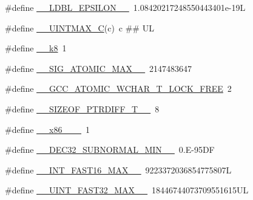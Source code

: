\begin{DoxyCompactItemize}
\item 
\#define \hyperlink{build-analizer__host-_desktop___qt__5__9__0___g_c_c__64bit-_release_2moc__predefs_8h_ad7a5615aea1516ee885112456cf695e8}{\+\_\+\+\_\+\+L\+D\+B\+L\+\_\+\+E\+P\+S\+I\+L\+O\+N\+\_\+\+\_\+}~1.\+08420217248550443401e-\/19\+L
\item 
\#define \hyperlink{build-analizer__host-_desktop___qt__5__9__0___g_c_c__64bit-_release_2moc__predefs_8h_aee4eb3a89493f1c9251a5a52f700f21d}{\+\_\+\+\_\+\+U\+I\+N\+T\+M\+A\+X\+\_\+\+C}(c)~c \#\# U\+L
\item 
\#define \hyperlink{build-analizer__host-_desktop___qt__5__9__0___g_c_c__64bit-_release_2moc__predefs_8h_a9b10b4191fdb9929f3210b21744efc41}{\+\_\+\+\_\+k8}~1
\item 
\#define \hyperlink{build-analizer__host-_desktop___qt__5__9__0___g_c_c__64bit-_release_2moc__predefs_8h_a9e75b72378b039587e4fc4006776826d}{\+\_\+\+\_\+\+S\+I\+G\+\_\+\+A\+T\+O\+M\+I\+C\+\_\+\+M\+A\+X\+\_\+\+\_\+}~2147483647
\item 
\#define \hyperlink{build-analizer__host-_desktop___qt__5__9__0___g_c_c__64bit-_release_2moc__predefs_8h_a775d1a831fa88d8c38c76d31947a8ebf}{\+\_\+\+\_\+\+G\+C\+C\+\_\+\+A\+T\+O\+M\+I\+C\+\_\+\+W\+C\+H\+A\+R\+\_\+\+T\+\_\+\+L\+O\+C\+K\+\_\+\+F\+R\+E\+E}~2
\item 
\#define \hyperlink{build-analizer__host-_desktop___qt__5__9__0___g_c_c__64bit-_release_2moc__predefs_8h_a2c1c95a99789b8c9721e896c48257f53}{\+\_\+\+\_\+\+S\+I\+Z\+E\+O\+F\+\_\+\+P\+T\+R\+D\+I\+F\+F\+\_\+\+T\+\_\+\+\_\+}~8
\item 
\#define \hyperlink{build-analizer__host-_desktop___qt__5__9__0___g_c_c__64bit-_release_2moc__predefs_8h_a9d2226f2d9644bcb9db4e3dda746f559}{\+\_\+\+\_\+x86\+\_\+\_\+\+\_\+}~1
\item 
\#define \hyperlink{build-analizer__host-_desktop___qt__5__9__0___g_c_c__64bit-_release_2moc__predefs_8h_a1b8832b164a1e36ed6756895a71c7e54}{\+\_\+\+\_\+\+D\+E\+C32\+\_\+\+S\+U\+B\+N\+O\+R\+M\+A\+L\+\_\+\+M\+I\+N\+\_\+\+\_\+}~0.\+E-\/95\+D\+F
\item 
\#define \hyperlink{build-analizer__host-_desktop___qt__5__9__0___g_c_c__64bit-_release_2moc__predefs_8h_ad4f33e46b6c0be1a2bbd83f3efe19165}{\+\_\+\+\_\+\+I\+N\+T\+\_\+\+F\+A\+S\+T16\+\_\+\+M\+A\+X\+\_\+\+\_\+}~9223372036854775807\+L
\item 
\#define \hyperlink{build-analizer__host-_desktop___qt__5__9__0___g_c_c__64bit-_release_2moc__predefs_8h_a61e63cea5ac78bcf0d282b70d63668e1}{\+\_\+\+\_\+\+U\+I\+N\+T\+\_\+\+F\+A\+S\+T32\+\_\+\+M\+A\+X\+\_\+\+\_\+}~18446744073709551615\+U\+L

\end{DoxyCompactItemize}
